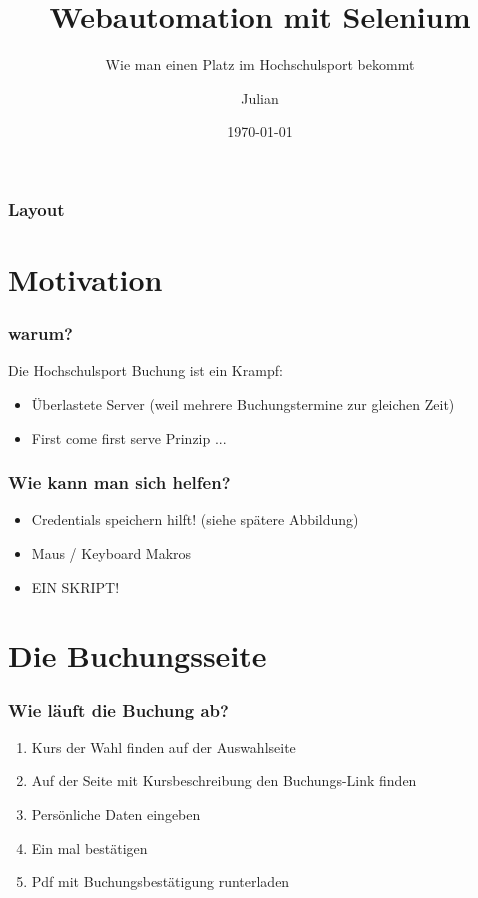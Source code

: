 \documentclass{beamer}
\author{Julian}
\title{Webautomation mit Selenium}
\subtitle{Wie man einen Platz im Hochschulsport bekommt}
\institute{Linx AG Blitztalk}
\date{\today}
\begin{document}
	\beamertemplatenavigationsymbolsempty %
	\maketitle
	
	
	\begin{frame}
	\frametitle{Layout}
	\tableofcontents
	\end{frame}
	
	\section{Motivation}
	\begin{frame}
	\frametitle{warum?}
	Die Hochschulsport Buchung ist ein Krampf:
	\begin{itemize}
		\item Überlastete Server (weil mehrere Buchungstermine zur gleichen Zeit)
		\item First come first serve Prinzip ...
	\end{itemize}
	\end{frame}
	
	\begin{frame}
	\frametitle{Wie kann man sich helfen?}
	\begin{itemize}
		\item Credentials speichern hilft! (siehe spätere Abbildung)
		\item Maus / Keyboard Makros
		\item EIN SKRIPT!
	\end{itemize}
	\end{frame}

	\section{Die Buchungsseite}
	\begin{frame}
	\frametitle{Wie läuft die Buchung ab?}
	\begin{enumerate}
		\item Kurs der Wahl finden auf der Auswahlseite
		\item Auf der Seite mit Kursbeschreibung den Buchungs-Link finden
		\item Persönliche Daten eingeben
		\item Ein mal bestätigen
		\item Pdf mit Buchungsbestätigung runterladen
	\end{enumerate}
	\end{frame}
	
\end{document}
